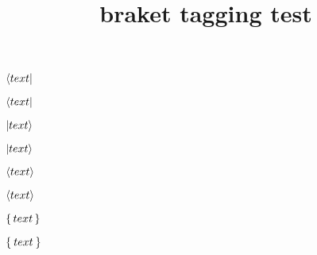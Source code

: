 \documentclass{article}
\title{braket tagging test}
\begin{document}
$\bra{text}$

$\Bra{text}$

$\ket{text}$

$\Ket{text}$

$\braket{text}$

$\Braket{text}$

$\set{text}$

$\Set{text}$
\end{document}
